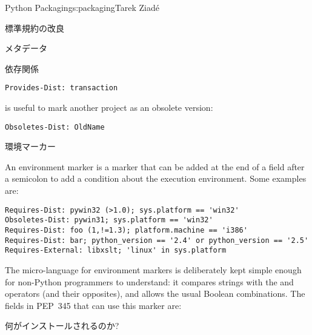 \begin{aosachapter}{Python Packaging}{s:packaging}{Tarek Ziad\'{e}}
\begin{aosasect1}{標準規約の改良}
\begin{aosasect2}{メタデータ}
\begin{aosasect3}{依存関係}
\begin{verbatim}
Provides-Dist: transaction
\end{verbatim}

\noindent {} is useful to mark another project as an obsolete
version:

\begin{verbatim}
Obsoletes-Dist: OldName
\end{verbatim}

\end{aosasect3}

\begin{aosasect3}{環境マーカー}

An environment marker is a marker that can be added at the end of a
field after a semicolon to add a condition about the execution
environment.  Some examples are:

\begin{verbatim}
Requires-Dist: pywin32 (>1.0); sys.platform == 'win32'
Obsoletes-Dist: pywin31; sys.platform == 'win32'
Requires-Dist: foo (1,!=1.3); platform.machine == 'i386'
Requires-Dist: bar; python_version == '2.4' or python_version == '2.5'
Requires-External: libxslt; 'linux' in sys.platform
\end{verbatim}

The micro-language for environment markers is deliberately kept simple
enough for non-Python programmers to understand: it compares strings
with the \code{==} and  operators (and their opposites), and
allows the usual Boolean combinations.  The fields in PEP~345 that can
use this marker are:

\begin{aosaitemize}
  \item {}
  \item {}
  \item {}
  \item {}
  \item {}
  \item {}
\end{aosaitemize}

\end{aosasect3}

\end{aosasect2}

\begin{aosasect2}{何がインストールされるのか?}


\end{aosasect2}
\end{aosasect1}
\end{aosachapter}
